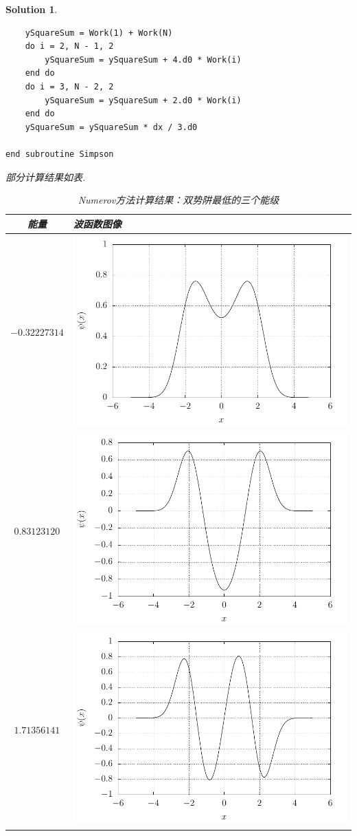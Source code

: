 \documentclass[UTF8,10pt,a4paper]{article}
\theoremstyle{Problem}
\theoremstyle{Solution}
\newtheorem*{sol}{Solution}
\begin{document}
\begin{sol}
\begin{lstlisting}
    ySquareSum = Work(1) + Work(N)
    do i = 2, N - 1, 2
        ySquareSum = ySquareSum + 4.d0 * Work(i)
    end do
    do i = 3, N - 2, 2
        ySquareSum = ySquareSum + 2.d0 * Work(i)
    end do
    ySquareSum = ySquareSum * dx / 3.d0

end subroutine Simpson
    \end{lstlisting}
    \newpage
    部分计算结果如表.
    \begin{table}[h]
        \centering
        \caption{Numerov方法计算结果：双势阱最低的三个能级}
        \label{4-Numerov}
        \begin{tabular}{cm{}}
        \hline
        能量 & 波函数图像 \\ \hline
        $-0.32227314$ & \includegraphics[width=.4\textwidth]{4-Numerov-0.pdf} \\
        $0.83123120$ & \includegraphics[width=.4\textwidth]{4-Numerov-1.pdf} \\
        $1.71356141$ & \includegraphics[width=.4\textwidth]{4-Numerov-2.pdf} \\ \hline
        \end{tabular}
        \end{table}


\end{sol}
\end{document}
